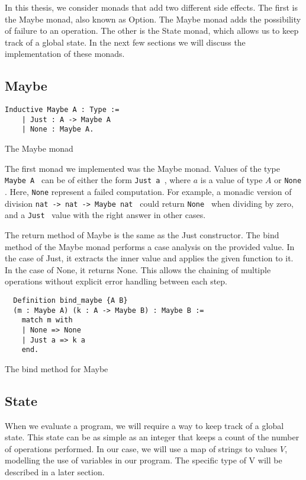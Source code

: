 In this thesis, we consider monads that add two different side effects. The
first is the Maybe monad, also known as Option. The Maybe monad adds the
possibility of failure to an operation. The other is the State monad, which
allows us to keep track of a global state. In the next few sections we will
discuss the implementation of these monads.

\subsection{Maybe}
\begin{listing}[H]
\begin{verbatim}
Inductive Maybe A : Type :=
    | Just : A -> Maybe A
    | None : Maybe A.
\end{verbatim}
\caption{The Maybe monad}
\label{lst:maybe_monad}
\end{listing}

The first monad we implemented was the Maybe monad. Values of the type
\texttt{Maybe A } can be of either the form 
\texttt{Just a }, where $a$ is a value of type $A$ or 
\texttt{None }. Here, \texttt{None} represent a failed
computation. For example, a monadic version of division \texttt{nat ->
nat -> Maybe nat } could return \texttt{None } when dividing by zero,
and a \texttt{Just } value with the right answer in other cases.

The return method of Maybe is the same as the Just constructor. 
The bind method of the Maybe monad performs a case analysis on the provided
value. In the case of Just, it extracts the inner value and applies the given
function to it. In the case of None, it returns None. This allows the chaining
of multiple operations without explicit error handling between each step.

\begin{listing}[H]
\begin{verbatim}
  Definition bind_maybe {A B} 
  (m : Maybe A) (k : A -> Maybe B) : Maybe B :=
    match m with
    | None => None
    | Just a => k a
    end.
\end{verbatim}
\caption{The bind method for Maybe}
\label{lst:bind_maybe}
\end{listing}

\subsection{State}
When we evaluate a program, we will require a way to keep track of a global
state. This state can be as simple as an integer that keeps a count of the
number of operations performed. In our case, we will use a map of strings to
values $V$,  modelling the use of variables in our program. The specific type 
of V will be described in a later section.

